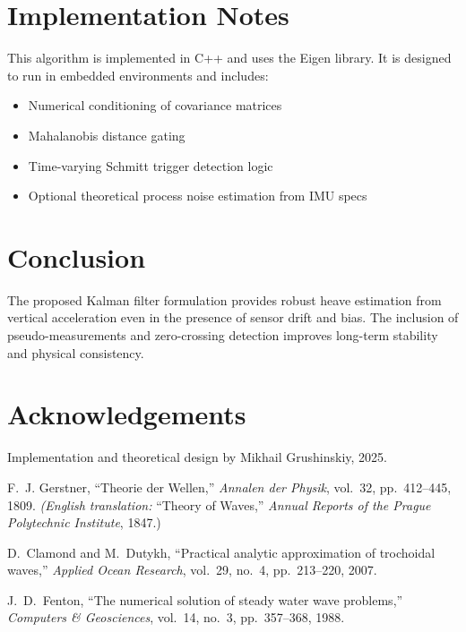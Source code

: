 \documentclass[12pt,letterpaper]{article}
\begin{document}
\section{Implementation Notes}

This algorithm is implemented in C++ and uses the Eigen library. It is designed to run in embedded environments and includes:
\begin{itemize}
  \item Numerical conditioning of covariance matrices
  \item Mahalanobis distance gating
  \item Time-varying Schmitt trigger detection logic
  \item Optional theoretical process noise estimation from IMU specs
\end{itemize}

\section{Conclusion}
The proposed Kalman filter formulation provides robust heave estimation from vertical acceleration even in the presence of sensor drift and bias. The inclusion of pseudo-measurements and zero-crossing detection improves long-term stability and physical consistency.

\section*{Acknowledgements}
Implementation and theoretical design by Mikhail Grushinskiy, 2025.

\begin{thebibliography}{3}

F.~J. Gerstner, ``Theorie der Wellen,'' 
\emph{Annalen der Physik}, vol.~32, pp.~412–445, 1809.  
\emph{(English translation: }``Theory of Waves,'' \emph{Annual Reports of the Prague Polytechnic Institute}, 1847.)

D.~Clamond and M.~Dutykh, ``Practical analytic approximation of trochoidal waves,'' 
\emph{Applied Ocean Research}, vol.~29, no.~4, pp.~213–220, 2007.

J.~D.~Fenton, “The numerical solution of steady water wave problems,” \emph{Computers \& Geosciences}, vol.~14, no.~3, pp.~357–368, 1988.

\end{thebibliography}
\end{document}
